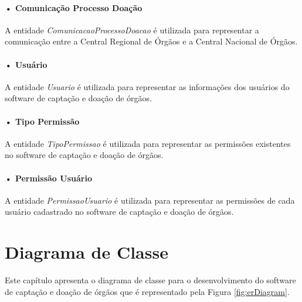 \documentclass[portuguese,oneside]{tcc}
\begin{document}
\paragraph*{• Comunicação Processo Doação}
A entidade \textit{ComunicacaoProcessoDoacao} é utilizada para representar a comunicação entre a Central Regional de Órgãos e a Central Nacional de Órgãos.

\paragraph*{• Usuário}
A entidade \textit{Usuario} é utilizada para representar as informações dos usuários do software de captação e doação de órgãos. 

\paragraph*{• Tipo Permissão}
A entidade \textit{TipoPermissao} é utilizada para representar as permissões existentes no software de captação e doação de órgãos.

\paragraph*{• Permissão Usuário}
A entidade \textit{PermissaoUsuario} é utilizada para representar as permissões de cada usuário cadastrado no software de captação e doação de órgãos.

\section{Diagrama de Classe}
Este capítulo apresenta o diagrama de classe para o desenvolvimento do software de captação e doação de órgãos que é representado pela Figura \ref{fig:erDiagram}.
\end{document}
